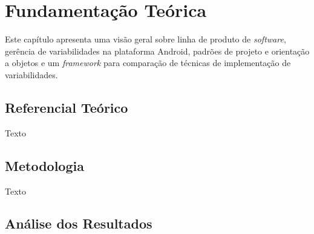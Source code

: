 \chapter{Fundamentação Teórica}
Este capítulo apresenta uma visão geral sobre linha de produto de \textit{software},
gerência de variabilidades na plataforma Android, padrões de projeto e orientação
a objetos e um \textit{framework} para comparação de técnicas de implementação
de variabilidades.

\section{Referencial Teórico}

Texto

\section{Metodologia}

Texto

\section{Análise dos Resultados}

